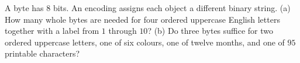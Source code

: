 A byte has $8$ bits. An encoding assigns each object a different binary string. (a) How many whole bytes are needed for four ordered uppercase English letters together with a label from $1$ through $10$? (b) Do three bytes suffice for two ordered uppercase letters, one of six colours, one of twelve months, and one of $95$ printable characters?
